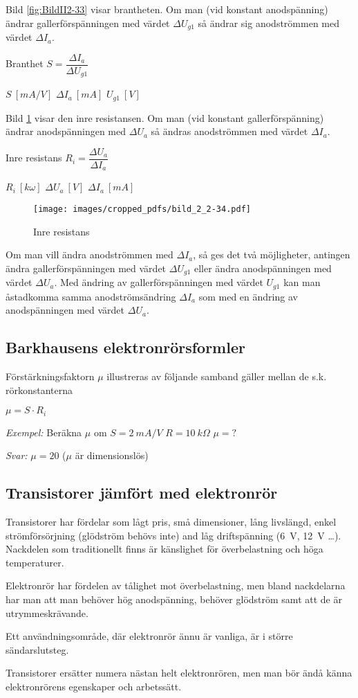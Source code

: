 Bild \ref{fig:BildII2-33} visar brantheten.
Om man (vid konstant anodspänning) ändrar gallerförspänningen med värdet
\(\Delta U_{g1}\) så ändrar sig anodströmmen med värdet \(\Delta I_a\).

Branthet \(S = \dfrac{\Delta I_a}{\Delta U_{g1}}\)

\(S\ [mA/V]\) \(\Delta I_a\ [mA]\) \(U_{g1}\ [V]\)

Bild \ref{fig:BildII2-34} visar den inre resistansen.
Om man (vid konstant gallerförspänning) ändrar anodspänningen med
\(\Delta U_a\) så ändras anodströmmen med värdet \(\Delta I_a\).

Inre resistans \(R_i = \dfrac{\Delta U_a}{\Delta I_a}\)

\(R_i\ [k \omega]\)  \(\Delta U_a\ [V]\)  \(\Delta I_a\ [mA]\)

\begin{figure}[ht]
\texttt{[image: images/cropped\_pdfs/bild\_2\_2-34.pdf]}
\caption{Inre resistans}
\label{fig:BildII2-34}
\end{figure}

Om man vill ändra anodströmmen med \(\Delta I_a\), så ges det två möjligheter,
antingen ändra gallerförspänningen med värdet \(\Delta U_{g1}\)
eller ändra anodspänningen med värdet \(\Delta U_a\).
Med ändring av gallerförspänningen med värdet \(U_{g1}\) kan man åstadkomma
samma anodströmsändring \(\Delta I_a\) som med en ändring av anodspänningen
med värdet \(\Delta U_a\).

\subsection{Barkhausens elektronrörsformler}

Förstärkningsfaktorn \(\mu \) illustreras av följande samband gäller mellan de s.k. rörkonstanterna

\(\mu = S \cdot R_i\)

\emph{Exempel:}
Beräkna \(\mu\)  om \(S = 2\ mA/V\) \(R = 10\ k\Omega\) \(\mu = ?\)

\emph{Svar:} \(\mu = 20\) (\(\mu\)  är dimensionslös)

\subsection{Transistorer jämfört med elektronrör}

Transistorer har fördelar som lågt pris, små dimensioner, lång livslängd,
enkel strömförsörjning (glödström behövs inte) and låg driftspänning (6~V,
12~V \ldots ). Nackdelen som traditionellt finns är känslighet för
överbelastning och höga temperaturer.

Elektronrör har fördelen av tålighet mot överbelastning, men bland nackdelarna
har man att man behöver hög anodspänning, behöver glödström samt att de är
utrymmeskrävande.

Ett användningsområde, där elektronrör ännu är vanliga, är i större
sändarslutsteg.

Transistorer ersätter numera nästan helt elektronrören, men man bör ändå känna
elektronrörens egenskaper och arbetssätt.
